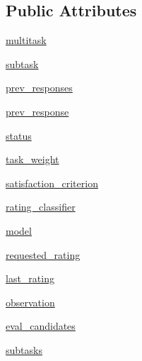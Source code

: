 \subsection*{Public Attributes}
\begin{DoxyCompactItemize}
\item 
\hyperlink{classself__feeding_1_1self__feeding__agent_1_1SelfFeedingAgent_a12f2d6f909f0eb8b4b8156e073e7bb95}{multitask}
\item 
\hyperlink{classself__feeding_1_1self__feeding__agent_1_1SelfFeedingAgent_ad08ff6158e3acf2ffe3b9c9931da7ccb}{subtask}
\item 
\hyperlink{classself__feeding_1_1self__feeding__agent_1_1SelfFeedingAgent_a27ac824e8f978ecaa8a40d973ea4b42d}{prev\+\_\+responses}
\item 
\hyperlink{classself__feeding_1_1self__feeding__agent_1_1SelfFeedingAgent_a9bcbe38dc1d8ded7d34676280e54cc2d}{prev\+\_\+response}
\item 
\hyperlink{classself__feeding_1_1self__feeding__agent_1_1SelfFeedingAgent_aedf90f87c0d0aa6bbab460e4b4d190a8}{status}
\item 
\hyperlink{classself__feeding_1_1self__feeding__agent_1_1SelfFeedingAgent_a2b74d181da38d6a0f91273d7802249a4}{task\+\_\+weight}
\item 
\hyperlink{classself__feeding_1_1self__feeding__agent_1_1SelfFeedingAgent_ac13ff9e92bb3650b6c15c51ad0204084}{satisfaction\+\_\+criterion}
\item 
\hyperlink{classself__feeding_1_1self__feeding__agent_1_1SelfFeedingAgent_a08305755b2fdd14eae66b55abf8de50e}{rating\+\_\+classifier}
\item 
\hyperlink{classself__feeding_1_1self__feeding__agent_1_1SelfFeedingAgent_a0939e63a7ee0e3f679c3b7086c2589ad}{model}
\item 
\hyperlink{classself__feeding_1_1self__feeding__agent_1_1SelfFeedingAgent_aa3d365c57936a448b3981bef2f7a04bc}{requested\+\_\+rating}
\item 
\hyperlink{classself__feeding_1_1self__feeding__agent_1_1SelfFeedingAgent_ad5201e5491619412389d386413bffbe4}{last\+\_\+rating}
\item 
\hyperlink{classself__feeding_1_1self__feeding__agent_1_1SelfFeedingAgent_aa826e88c1add64cff04a432785f0e43a}{observation}
\item 
\hyperlink{classself__feeding_1_1self__feeding__agent_1_1SelfFeedingAgent_a36938129a0e9388b99080640471ed668}{eval\+\_\+candidates}
\item 
\hyperlink{classself__feeding_1_1self__feeding__agent_1_1SelfFeedingAgent_a37e85a73af4cff789a7a7de7e503bb9c}{subtasks}
\end{DoxyCompactItemize}
